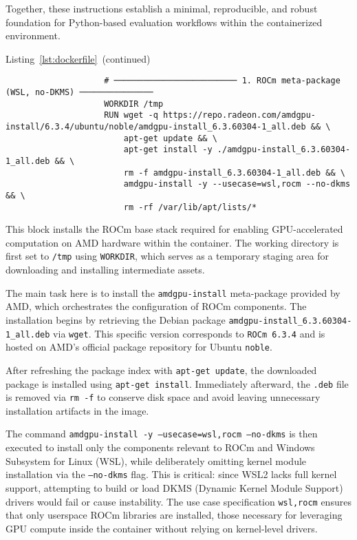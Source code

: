 Together, these instructions establish a minimal, reproducible, and robust foundation for Python-based evaluation workflows within the containerized environment.

\vspace{1em}

\begin{minipage}{\textwidth}
	\captionsetup{type=listing}
	\caption*{Listing~\ref{lst:dockerfile}~(continued)}

	\begin{verbatim}
                    # ───────────────────────── 1. ROCm meta-package (WSL, no-DKMS) ───────────────
                    WORKDIR /tmp
                    RUN wget -q https://repo.radeon.com/amdgpu-install/6.3.4/ubuntu/noble/amdgpu-install_6.3.60304-1_all.deb && \
                        apt-get update && \
                        apt-get install -y ./amdgpu-install_6.3.60304-1_all.deb && \
                        rm -f amdgpu-install_6.3.60304-1_all.deb && \
                        amdgpu-install -y --usecase=wsl,rocm --no-dkms && \
                        rm -rf /var/lib/apt/lists/*

    \end{verbatim}
\end{minipage}

This block installs the ROCm base stack required for enabling GPU-accelerated computation on AMD hardware within the container. The working directory is first set to \texttt{/tmp} using \texttt{WORKDIR}, which serves as a temporary staging area for downloading and installing intermediate assets.

The main task here is to install the \texttt{amdgpu-install} meta-package provided by AMD, which orchestrates the configuration of ROCm components. The installation begins by retrieving the Debian package \texttt{amdgpu-install\_6.3.60304-1\_all.deb} via \texttt{wget}. This specific version corresponds to \texttt{ROCm 6.3.4} and is hosted on AMD’s official package repository for Ubuntu \texttt{noble}.

After refreshing the package index with \texttt{apt-get update}, the downloaded package is installed using \texttt{apt-get install}. Immediately afterward, the \texttt{.deb} file is removed via \texttt{rm -f} to conserve disk space and avoid leaving unnecessary installation artifacts in the image.

The command \texttt{amdgpu-install -y --usecase=wsl,rocm --no-dkms} is then executed to install only the components relevant to ROCm and Windows Subsystem for Linux (WSL), while deliberately omitting kernel module installation via the \texttt{--no-dkms} flag. This is critical: since WSL2 lacks full kernel support, attempting to build or load DKMS (Dynamic Kernel Module Support) drivers would fail or cause instability. The use case specification \texttt{wsl,rocm} ensures that only userspace ROCm libraries are installed, those necessary for leveraging GPU compute inside the container without relying on kernel-level drivers.


